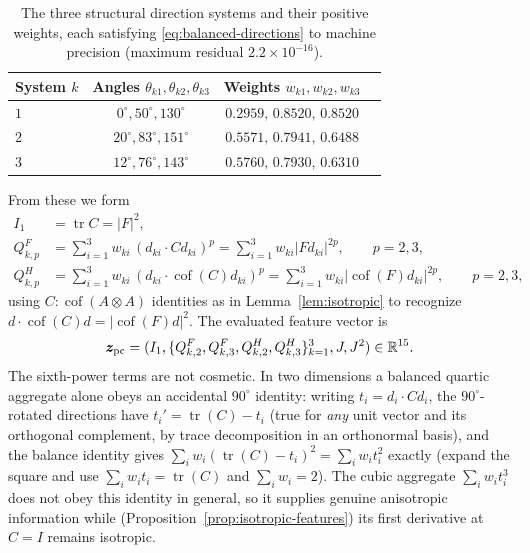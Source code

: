 \documentclass[10pt,a4paper]{article}
\newcommand{\Cof}{\operatorname{cof}}
\newcommand{\tr}{\operatorname{tr}}
\newcommand{\R}{\mathbb{R}}
\begin{document}
\begin{table}[h]
\centering
\caption{The three structural direction systems and their positive
weights, each satisfying \eqref{eq:balanced-directions} to machine
precision (maximum residual $2.2\times10^{-16}$).}
\label{tab:direction-systems}
\begin{tabular}{lccc}
\toprule
System $k$ & Angles $\theta_{k1},\theta_{k2},\theta_{k3}$ & Weights $w_{k1},w_{k2},w_{k3}$\\
\midrule
$1$ & $0^\circ,50^\circ,130^\circ$ & $0.2959,\,0.8520,\,0.8520$\\
$2$ & $20^\circ,83^\circ,151^\circ$ & $0.5571,\,0.7941,\,0.6488$\\
$3$ & $12^\circ,76^\circ,143^\circ$ & $0.5760,\,0.7930,\,0.6310$\\
\bottomrule
\end{tabular}
\end{table}

From these we form
\begin{align}
 I_1&=\tr C=|F|^2,\nonumber\\
 Q_{k,p}^F&=\sum_{i=1}^3 w_{ki}\,(d_{ki}\cdot Cd_{ki})^p
       =\sum_{i=1}^3 w_{ki}|Fd_{ki}|^{2p},\qquad p=2,3,\nonumber\\
 Q_{k,p}^H&=\sum_{i=1}^3 w_{ki}\,(d_{ki}\cdot\Cof(C)d_{ki})^p
       =\sum_{i=1}^3 w_{ki}|\Cof(F)d_{ki}|^{2p},\qquad p=2,3,
 \label{eq:qfeatures}
\end{align}
using $C:\Cof(A\otimes A)$ identities as in Lemma~\ref{lem:isotropic} to
recognize $d\cdot\Cof(C)d=|\Cof(F)d|^2$. The evaluated feature vector is
\begin{equation}
 \bm z_{\rm pc}=(I_1,\{Q_{k,2}^F,Q_{k,3}^F,Q_{k,2}^H,Q_{k,3}^H\}_{k=1}^3,J,J^2)
 \in\R^{15}.
 \label{eq:features}
\end{equation}
The sixth-power terms are not cosmetic. In two dimensions a balanced
quartic aggregate alone obeys an accidental $90^\circ$ identity: writing
$t_i=d_i\cdot Cd_i$, the $90^\circ$-rotated directions have $t_i'=\tr(C)-t_i$
(true for \emph{any} unit vector and its orthogonal complement, by trace
decomposition in an orthonormal basis), and the balance identity gives
$\sum_iw_i(\tr(C)-t_i)^2=\sum_iw_it_i^2$ exactly (expand the square and
use $\sum_iw_it_i=\tr(C)$ and $\sum_iw_i=2$). The cubic aggregate
$\sum_iw_it_i^3$ does not obey this identity in general, so it supplies
genuine anisotropic information while (Proposition~\ref{prop:isotropic-features})
its first derivative at $C=I$ remains isotropic.
\end{document}
